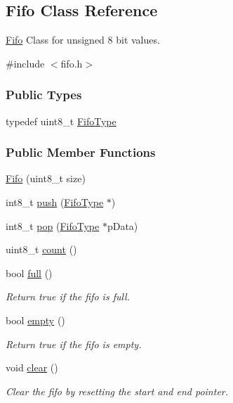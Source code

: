 \hypertarget{class_fifo}{
\subsection{Fifo Class Reference}
\label{class_fifo}
}


\hyperlink{class_fifo}{Fifo} Class for unsigned 8 bit values.  




{\ttfamily \#include $<$fifo.h$>$}

\subsubsection*{Public Types}
\begin{DoxyCompactItemize}
\item 
typedef uint8\_\-t \hyperlink{class_fifo_abc2a9e471beb538424db9e33955ec5f7}{FifoType}
\end{DoxyCompactItemize}
\subsubsection*{Public Member Functions}
\begin{DoxyCompactItemize}
\item 
\hyperlink{class_fifo_a68ef51a0abbde28576475176bea5ee77}{Fifo} (uint8\_\-t size)
\item 
int8\_\-t \hyperlink{class_fifo_a56e69165c03aa37aa174505386737430}{push} (\hyperlink{class_fifo_abc2a9e471beb538424db9e33955ec5f7}{FifoType} $\ast$)
\item 
int8\_\-t \hyperlink{class_fifo_aa5aa61cf236c38b141bd1bbeaf1addbd}{pop} (\hyperlink{class_fifo_abc2a9e471beb538424db9e33955ec5f7}{FifoType} $\ast$pData)
\item 
uint8\_\-t \hyperlink{class_fifo_a0a741f582688e9f956fd9e8c4cd1da37}{count} ()
\item 
bool \hyperlink{class_fifo_a2b09a5751fc2a301a341245e98f1e44a}{full} ()
\begin{DoxyCompactList}\small\item\em Return true if the fifo is full. \item\end{DoxyCompactList}\item 
bool \hyperlink{class_fifo_af0223af74146f1e800aa0a7b44a2cfda}{empty} ()
\begin{DoxyCompactList}\small\item\em Return true if the fifo is empty. \item\end{DoxyCompactList}\item 
void \hyperlink{class_fifo_a61aa8164d2e6fbdb2718835755495c95}{clear} ()
\begin{DoxyCompactList}\small\item\em Clear the fifo by resetting the start and end pointer. \item\end{DoxyCompactList}\end{DoxyCompactItemize}
